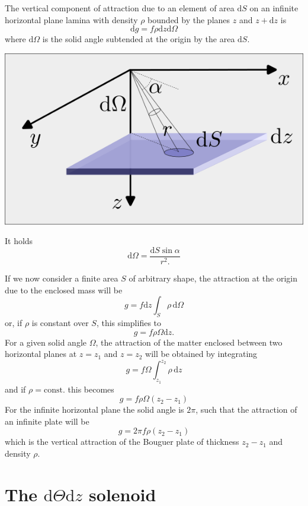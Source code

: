\documentclass[
  a4paper,
  DIV=11,
  numbers=noendperiod]{scrreprt}
\begin{document}
The vertical component of attraction due to an element of area
\(\mathrm{d}S\) on an infinite horizontal plane lamina with density
\(\rho\) bounded by the planes \(z\) and \(z+\mathrm{d}z\) is \[
\mathrm{d}g = f \rho \mathrm{d}z \mathrm{d}\Omega 
\] where \(\mathrm{d}\Omega\) is the solid angle subtended at the origin
by the area \(\mathrm{d}S\).

\includegraphics{images/hubbert_01.png}

It holds \[
\mathrm{d}\Omega = \frac{\mathrm{d}S \sin \alpha}{r^{2}.}
\]

If we now consider a finite area \(S\) of arbitrary shape, the
attraction at the origin due to the enclosed mass will be \[
g = f \mathrm{d}z \int _{S} \rho \, \mathrm{d}\Omega 
\] or, if \(\rho\) is constant over \(S\), this simplifies to \[
g = f \rho \Omega \mathrm{d}z.
\] For a given solid angle \(\Omega\), the attraction of the matter
enclosed between two horizontal planes at \(z=z_{1}\) and \(z=z_{2}\)
will be obtained by integrating \[
g = f \Omega \int_{z_{1}}^{z_{2}} \rho \, \mathrm{d}z 
\] and if \(\rho=\mathrm{const.}\) this becomes \[
g = f \rho \Omega (z_{2} - z_{1})
\] For the infinite horizontal plane the solid angle is \(2 \pi\), such
that the attraction of an infinite plate will be \[
g = 2 \pi f \rho (z_{2} - z_{1})
\] which is the vertical attraction of the Bouguer plate of thickness
\(z_{2} - z_{1}\) and density \(\rho\).

\section{\texorpdfstring{The \(\mathrm{d}\Theta\mathrm{d}z\)
solenoid}{The \textbackslash mathrm\{d\}\textbackslash Theta\textbackslash mathrm\{d\}z solenoid}}\label{the-mathrmdthetamathrmdz-solenoid}
\end{document}
